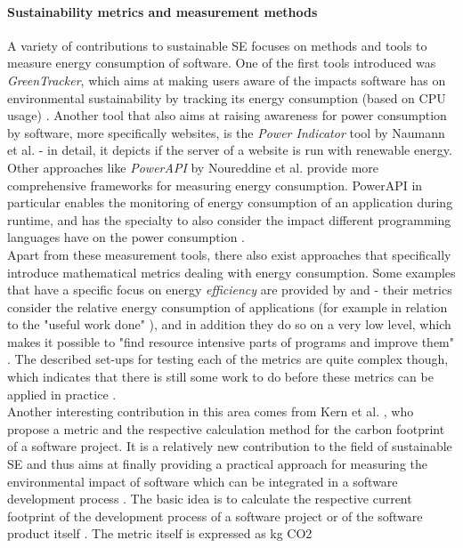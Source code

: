 \documentclass[oribibl]{llncs}
\begin{document}
\paragraph{Sustainability metrics and measurement methods} A variety of contributions to sustainable SE focuses on methods and tools to measure energy consumption of software. %
One of the first tools introduced was \textit{GreenTracker}, which aims at making users aware of the impacts software has on environmental sustainability by tracking its energy consumption (based on CPU usage) \cite{amsel_toward_2011}. Another tool that also aims at raising awareness for power consumption by software, more specifically websites, is the \textit{Power Indicator} tool by Naumann et al. \cite{naumann_how_2008} - in detail, it depicts if the server of a website is run with renewable energy. %
Other approaches like \textit{PowerAPI} by Noureddine et al. \cite{noureddine_preliminary_2012} provide more comprehensive frameworks for measuring energy consumption. PowerAPI in particular enables the monitoring of energy consumption of an application during runtime, and has the specialty to also consider the impact different programming languages have on the power consumption \cite{noureddine_preliminary_2012}.\\
Apart from these measurement tools, there also exist approaches that specifically introduce mathematical metrics dealing with energy consumption. %
Some %
examples that have a specific focus on energy \textit{efficiency} are provided by \cite{capra_is_2012} and \cite{johann_how_2012} - their metrics consider the relative energy consumption of applications (for example in relation to the "useful work done" \cite{johann_how_2012}), and in addition they do so on a very low level, which makes it possible to "find resource intensive parts of programs and improve them" \cite{johann_how_2012}. The described set-ups for testing each of the metrics are quite complex though, which indicates that there is still some work to do before these metrics can be applied in practice \cite{johann_how_2012}.\\
Another interesting contribution in this area comes from Kern et al. \cite{kern_impacts_2015}, who propose a metric and the respective calculation method for the carbon footprint of a software project. It is a relatively new contribution to the field of sustainable SE and thus aims at finally providing a practical approach for measuring the environmental impact of software which can be integrated in a software development process \cite{kern_impacts_2015}. The basic idea is to calculate the respective current footprint of the development process of a software project or of the software product itself \cite{kern_impacts_2015}. The metric itself is expressed as kg CO2 %
\end{document}

